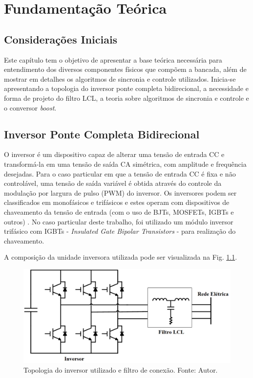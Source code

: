 \chapter{Fundamentação Teórica}

\section{Considerações Iniciais}

Este capítulo tem o objetivo de apresentar a base teórica necessária para entendimento dos diversos componentes físicos que compõem a bancada,
além de mostrar em detalhes os algoritmos de sincronia e controle utilizados.
Inicia-se apresentando a topologia do inversor ponte completa bidirecional, a necessidade e forma de projeto do filtro LCL, a teoria sobre algoritmos de sincronia e controle e o conversor \textit{boost}.

\section{Inversor Ponte Completa Bidirecional}

O inversor é um dispositivo capaz de alterar uma tensão de entrada CC e transformá-la em uma tensão de saída CA simétrica, com amplitude e frequência desejadas. Para o caso particular em que a tensão de entrada CC é fixa e não controlável, uma tensão de saída variável é obtida através do controle da modulação por largura de pulso (PWM) do inversor. Os inversores podem ser classificados em monofásicos e trifásicos e estes operam com dispositivos de chaveamento da tensão de entrada (com o uso de BJTs, MOSFETs, IGBTs e outros) \cite{MRashid}. No caso particular deste trabalho, foi utilizado um módulo inversor trifásico com IGBTs - \textit{Insulated Gate Bipolar Transistors} - para realização do chaveamento. 

A composição da unidade inversora utilizada pode ser visualizada na Fig. \ref{fig:Inversor}.

\begin{figure}[!hbt]
	\begin{center}
		\includegraphics[scale=0.5]{figuras/Inversor.png}
		\caption{Topologia do inversor utilizado e filtro de conexão. Fonte: Autor.}
		\label{fig:Inversor}
	\end{center}
\end{figure}


